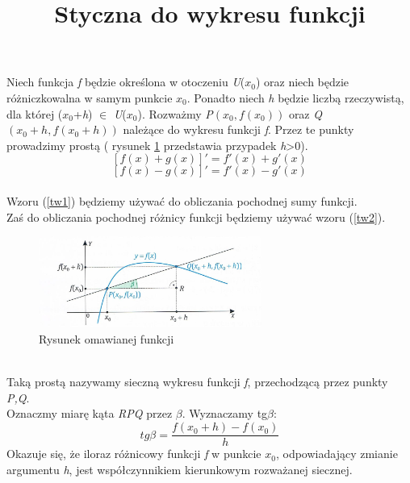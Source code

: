 \documentclass[12pt]{article}
\title{Styczna do wykresu funkcji}
\date{}
\begin{document}
\maketitle
\noindent
Niech funkcja \textit{f} będzie określona w otoczeniu \textit{U}($x_{0}$) oraz niech będzie różniczkowalna w samym punkcie $x_0$. Ponadto niech \textit{h} będzie liczbą rzeczywistą, dla której ($x_0$+\textit{h}) $\in$ \textit{U}($x_{0}$). Rozważmy \textit{P}$\left(x_0, f(x_0)\right)$ oraz \textit{Q}$\left(x_0+h, f(x_0+h)\right)$ należące do wykresu funkcji \textit{f}. Przez te punkty prowadzimy prostą ( rysunek \ref{rys_model} przedstawia przypadek \textit{h}>0).\\
\begin{equation}
\label{tw1}
[f(x)+g(x)]'= f'(x)+g'(x) 
\end{equation}
\begin{equation}
\label{tw2}
[f(x)-g(x)]'= f'(x)-g'(x) 
\end{equation}
\\
Wzoru (\ref{tw1}) będziemy używać do obliczania pochodnej sumy funkcji.\\
Zaś do obliczania pochodnej różnicy funkcji będziemy używać wzoru (\ref{tw2}).
\begin{figure}[ht]
\begin{center}
\includegraphics[height=3cm]{zdj1.jpg}
\caption{Rysunek omawianej funkcji}
\label{rys_model}
\end{center}
\end{figure}\\
Taką prostą nazywamy sieczną wykresu funkcji \textit{f}, przechodzącą przez punkty \textit{P,Q}.\\
 Oznaczmy miarę kąta \textit{RPQ} przez $\beta$. Wyznaczamy tg$\beta$:\\ 
 \begin{equation}
 \label{twierdzenie}
 tg \beta = \frac{f(x_0+h)-f(x_0)}{h}
 \end{equation}
\newpage Okazuje się, że iloraz różnicowy funkcji \textit{f} w punkcie $x_0$, odpowiadający zmianie argumentu \textit{h}, jest współczynnikiem kierunkowym rozważanej siecznej.\\
\\
\end{document}
